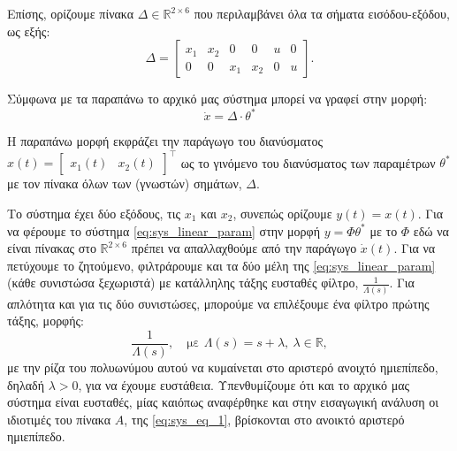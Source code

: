 \documentclass[12pt]{article} %
\numberwithin{equation}{section}  %
\begin{document}
\noindent Επίσης, ορίζουμε πίνακα $\Delta \in \mathbb{R}^{2 \times 6}$ που περιλαμβάνει όλα τα σήματα εισόδου-εξόδου, ως εξής:
\begin{equation}
\Delta = \begin{bmatrix}
    x_1 & x_2 & 0   & 0   & u & 0 \\
    0   & 0   & x_1 & x_2 & 0 & u
\end{bmatrix}.
\end{equation}

\noindent Σύμφωνα με τα παραπάνω το αρχικό μας σύστημα μπορεί να γραφεί στην μορφή:
\vspace{-\topsep}
\vspace{+2pt}
\begin{equation}\label{eq:sys_linear_param}
    \dot{x} = \Delta \cdot \theta^{*}
\end{equation}

\vspace{-\topsep}
\vspace{+3pt}

\noindent Η παραπάνω μορφή εκφράζει την παράγωγο του διανύσματος $x(t) = \begin{bmatrix} x_1(t) & x_2(t)  \end{bmatrix}^{\top}$ ως το γινόμενο του διανύσματος των παραμέτρων $\theta^{*}$ με τον πίνακα όλων των (γνωστών) σημάτων, $\Delta$.

\vspace{+5pt}

\noindent\textbullet\hspace{0.2em} 
Το σύστημα έχει δύο εξόδους, τις $x_1$ και $x_2$, συνεπώς ορίζουμε $y(t) = x(t)$. 
Για να φέρουμε το σύστημα \eqref{eq:sys_linear_param} στην μορφή $y = \Phi \theta^{*} $\textemdash 
με το $\Phi$ εδώ να είναι πίνακας στο $\mathbb{R}^{2 \times 6}$\textemdash 
πρέπει να απαλλαχθούμε από την παράγωγο $\dot{x}(t)$.
Για να πετύχουμε το ζητούμενο, φιλτράρουμε και τα δύο μέλη της \eqref{eq:sys_linear_param} (κάθε συνιστώσα ξεχωριστά) με κατάλληλης τάξης ευσταθές φίλτρο, $\frac{1}{\Lambda(s)}$.
Για απλότητα και για τις δύο συνιστώσες, μπορούμε να επιλέξουμε ένα φίλτρο πρώτης τάξης, μορφής:
\vspace{-\topsep}
\vspace{+3pt}
\begin{equation}\label{eq:filter}
\frac{1}{\Lambda(s)}, \quad \text{με }\Lambda(s) = s + \lambda,\  \lambda \in \mathbb{R},
\end{equation}
με την ρίζα του πολυωνύμου αυτού να κυμαίνεται στο αριστερό ανοιχτό ημιεπίπεδο, δηλαδή $\lambda > 0$, για να έχουμε ευστάθεια.
Υπενθυμίζουμε ότι και το αρχικό μας σύστημα είναι ευσταθές, μίας και\textemdash όπως αναφέρθηκε και στην εισαγωγική ανάλυση\textemdash 
οι ιδιοτιμές του πίνακα $A$, της \eqref{eq:sys_eq_1}, βρίσκονται στο ανοικτό αριστερό ημιεπίπεδο.
\end{document}
